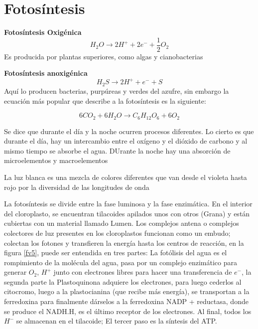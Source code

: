 \section{Fotosíntesis}
\textbf{Fotosíntesis Oxigénica}
\begin{equation}
    H_2O\longrightarrow 2H^++2e^-+\frac{1}{2}O_2
\end{equation}
Es producida por plantas superiores, como algas y cianobacterias

\textbf{Fotosíntesis anoxigénica}
\begin{equation}
    H_2S\longrightarrow 2H^++e^-+S
\end{equation}
Aquí lo producen bacterias, purpúreas y verdes del azufre,
sin embargo la ecuación más popular que describe a la fotosíntesis es la siguiente: 

\begin{equation}
    6CO_2+6H_2O\longrightarrow C_6H_{12}O_6+6O_2
\end{equation}


Se dice que durante el día y la noche ocurren procesos diferentes. Lo cierto es que durante el día, hay un intercambio entre el oxígeno y el dióxido de carbono y al mismo tiempo se absorbe el agua. DUrante la noche hay una absorción de microelementos y macroelementos

\begin{definition}
    La luz blanca es una mezcla de colores diferentes que van desde el violeta hasta rojo por la diversidad de las longitudes de onda
\end{definition}

La fotosíntesis se divide entre la fase luminosa y la fase enzimática. En el interior del cloroplasto, se encuentran tilacoides apilados unos con otros (Grana) y están cubiertas con un material llamado Lumen.
Los complejos antena o complejos colectores de luz presentes en los cloroplastos funcionan como un embudo; colectan los fotones y transfieren la energía hasta los centros de reacción, en la figura \ref{fv5}, puede
ser entendida en tres partes: La fotólisis del agua es el rompimiento de la molécula del agua, pasa por un complejo enzimático para generar $O_2$, $H^+$ junto con electrones libres para hacer una transferencia de $e^-$, la segunda parte la Plastoquinona adquiere los electrones, para luego cederlos al citocromo, luego a la plastocianina (que recibe más energía), se transportan a la ferredoxina para finalmente dárselos a la ferredoxina NADP + reductasa, donde se produce el NADH.H, es el último receptor de los electrones.
Al final, todos los $H^-$ se almacenan en el tilacoide; El tercer paso es la síntesis del ATP.

